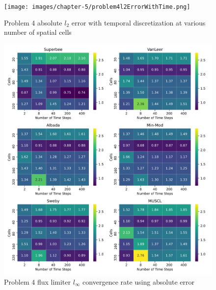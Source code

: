 \clearpage

\begin{figure}[p]
    \centering
    \texttt{[image: images/chapter-5/problem4l2ErrorWithTime.png]}
    \caption{Problem 4 absolute $l_{2}$ error with temporal discretization at various number of spatial cells}
    \label{fig:problem4_l2error_time_results}
\end{figure}

\clearpage

\begin{figure}[p]
    \centering
    \includegraphics[width=6in]{images/chapter-5/problem4linftyFluxLimiterConvergenceRate.png}
    \caption{Problem 4 flux limiter $l_{\infty}$ convergence rate using absolute error}
    \label{fig:problem4_linferror_fluxlimiter_convergence_rate}
\end{figure}

\clearpage

